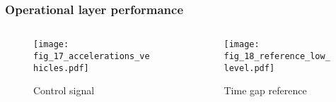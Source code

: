 \begin{frame}
    \frametitle{Operational layer performance}
    \begin{columns}
      \begin{column}{0.5\textwidth}
        \begin{figure}
          \centering
          \texttt{[image: fig\_17\_accelerations\_vehicles.pdf]}
          \caption{Control signal}
        \end{figure}
      \end{column}
      \begin{column}{0.5\textwidth}
        \begin{figure}
          \centering
          \texttt{[image: fig\_18\_reference\_low\_level.pdf]}
          \caption{Time gap reference}
        \end{figure}
      \end{column}
    \end{columns}
\end{frame}